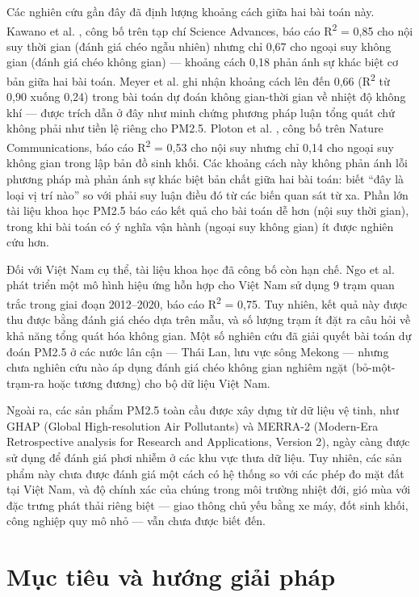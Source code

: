 Các nghiên cứu gần đây đã định lượng khoảng cách giữa hai bài toán này. Kawano et al. \cite{kawano2025}, công bố trên tạp chí Science Advances, báo cáo R\textsuperscript{2} = 0,85 cho nội suy thời gian (đánh giá chéo ngẫu nhiên) nhưng chỉ 0,67 cho ngoại suy không gian (đánh giá chéo không gian) --- khoảng cách 0,18 phản ánh sự khác biệt cơ bản giữa hai bài toán. Meyer et al. \cite{meyer2018} ghi nhận khoảng cách lên đến 0,66 (R\textsuperscript{2} từ 0,90 xuống 0,24) trong bài toán dự đoán không gian-thời gian về nhiệt độ không khí --- được trích dẫn ở đây như minh chứng phương pháp luận tổng quát chứ không phải như tiền lệ riêng cho PM2.5. Ploton et al. \cite{ploton2020}, công bố trên Nature Communications, báo cáo R\textsuperscript{2} = 0,53 cho nội suy nhưng chỉ 0,14 cho ngoại suy không gian trong lập bản đồ sinh khối. Các khoảng cách này không phản ánh lỗi phương pháp mà phản ánh sự khác biệt bản chất giữa hai bài toán: biết ``đây là loại vị trí nào'' so với phải suy luận điều đó từ các biến quan sát từ xa. Phần lớn tài liệu khoa học PM2.5 báo cáo kết quả cho bài toán dễ hơn (nội suy thời gian), trong khi bài toán có ý nghĩa vận hành (ngoại suy không gian) ít được nghiên cứu hơn.

Đối với Việt Nam cụ thể, tài liệu khoa học đã công bố còn hạn chế. Ngo et al. \cite{ngo2023} phát triển một mô hình hiệu ứng hỗn hợp cho Việt Nam sử dụng 9 trạm quan trắc trong giai đoạn 2012--2020, báo cáo R\textsuperscript{2} = 0,75. Tuy nhiên, kết quả này được thu được bằng đánh giá chéo dựa trên mẫu, và số lượng trạm ít đặt ra câu hỏi về khả năng tổng quát hóa không gian. Một số nghiên cứu đã giải quyết bài toán dự đoán PM2.5 ở các nước lân cận --- Thái Lan, lưu vực sông Mekong --- nhưng chưa nghiên cứu nào áp dụng đánh giá chéo không gian nghiêm ngặt (bỏ-một-trạm-ra hoặc tương đương) cho bộ dữ liệu Việt Nam.

Ngoài ra, các sản phẩm PM2.5 toàn cầu được xây dựng từ dữ liệu vệ tinh, như GHAP (Global High-resolution Air Pollutants) và MERRA-2 (Modern-Era Retrospective analysis for Research and Applications, Version 2), ngày càng được sử dụng để đánh giá phơi nhiễm ở các khu vực thưa dữ liệu. Tuy nhiên, các sản phẩm này chưa được đánh giá một cách có hệ thống so với các phép đo mặt đất tại Việt Nam, và độ chính xác của chúng trong môi trường nhiệt đới, gió mùa với đặc trưng phát thải riêng biệt --- giao thông chủ yếu bằng xe máy, đốt sinh khối, công nghiệp quy mô nhỏ --- vẫn chưa được biết đến.


\section{Mục tiêu và hướng giải pháp}

